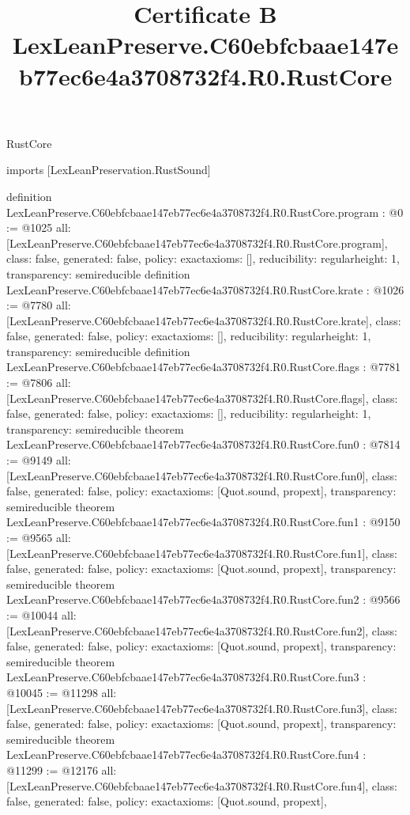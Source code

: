 \begin{lexlean}{RustCore}
\title{Certificate B LexLeanPreserve.C60ebfcbaae147eb77ec6e4a3708732f4.R0.RustCore}
\begin{coremodule}
imports [LexLeanPreservation.RustSound]

definition LexLeanPreserve.C60ebfcbaae147eb77ec6e4a3708732f4.R0.RustCore.program : @0 := @1025 {
  all: [LexLeanPreserve.C60ebfcbaae147eb77ec6e4a3708732f4.R0.RustCore.program],
  class: false,
  generated: false,
  policy: exact{axioms: []},
  reducibility: regular{height: 1},
  transparency: semireducible
}
definition LexLeanPreserve.C60ebfcbaae147eb77ec6e4a3708732f4.R0.RustCore.krate : @1026 := @7780 {
  all: [LexLeanPreserve.C60ebfcbaae147eb77ec6e4a3708732f4.R0.RustCore.krate],
  class: false,
  generated: false,
  policy: exact{axioms: []},
  reducibility: regular{height: 1},
  transparency: semireducible
}
definition LexLeanPreserve.C60ebfcbaae147eb77ec6e4a3708732f4.R0.RustCore.flags : @7781 := @7806 {
  all: [LexLeanPreserve.C60ebfcbaae147eb77ec6e4a3708732f4.R0.RustCore.flags],
  class: false,
  generated: false,
  policy: exact{axioms: []},
  reducibility: regular{height: 1},
  transparency: semireducible
}
theorem LexLeanPreserve.C60ebfcbaae147eb77ec6e4a3708732f4.R0.RustCore.fun0 : @7814 := @9149 {
  all: [LexLeanPreserve.C60ebfcbaae147eb77ec6e4a3708732f4.R0.RustCore.fun0],
  class: false,
  generated: false,
  policy: exact{axioms: [Quot.sound, propext]},
  transparency: semireducible
}
theorem LexLeanPreserve.C60ebfcbaae147eb77ec6e4a3708732f4.R0.RustCore.fun1 : @9150 := @9565 {
  all: [LexLeanPreserve.C60ebfcbaae147eb77ec6e4a3708732f4.R0.RustCore.fun1],
  class: false,
  generated: false,
  policy: exact{axioms: [Quot.sound, propext]},
  transparency: semireducible
}
theorem LexLeanPreserve.C60ebfcbaae147eb77ec6e4a3708732f4.R0.RustCore.fun2 : @9566 := @10044 {
  all: [LexLeanPreserve.C60ebfcbaae147eb77ec6e4a3708732f4.R0.RustCore.fun2],
  class: false,
  generated: false,
  policy: exact{axioms: [Quot.sound, propext]},
  transparency: semireducible
}
theorem LexLeanPreserve.C60ebfcbaae147eb77ec6e4a3708732f4.R0.RustCore.fun3 : @10045 := @11298 {
  all: [LexLeanPreserve.C60ebfcbaae147eb77ec6e4a3708732f4.R0.RustCore.fun3],
  class: false,
  generated: false,
  policy: exact{axioms: [Quot.sound, propext]},
  transparency: semireducible
}
theorem LexLeanPreserve.C60ebfcbaae147eb77ec6e4a3708732f4.R0.RustCore.fun4 : @11299 := @12176 {
  all: [LexLeanPreserve.C60ebfcbaae147eb77ec6e4a3708732f4.R0.RustCore.fun4],
  class: false,
  generated: false,
  policy: exact{axioms: [Quot.sound, propext]},
}
\end{coremodule}
\end{lexlean}
